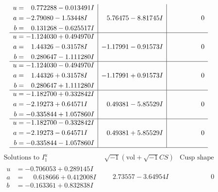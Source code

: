 \documentclass[1p]{elsarticle_modified}
\theoremstyle{definition}
\newcommand{\I}{\sqrt{-1}}
\begin{document}
$$\begin{array}{c|c|c}
\begin{aligned}
u &= \phantom{-}0.772288 - 0.013491 I \\
a &= -2.79080 - 1.53448 I \\
b &= \phantom{-}0.131268 - 0.625517 I\end{aligned}
 & \phantom{-}5.76475 - 8.81745 I & \phantom{-0.000000 } 0 \\ \hline\begin{aligned}
u &= -1.124030 + 0.494970 I \\
a &= \phantom{-}1.44326 - 0.31578 I \\
b &= \phantom{-}0.280647 - 1.111280 I\end{aligned}
 & -1.17991 - 0.91573 I & \phantom{-0.000000 } 0 \\ \hline\begin{aligned}
u &= -1.124030 - 0.494970 I \\
a &= \phantom{-}1.44326 + 0.31578 I \\
b &= \phantom{-}0.280647 + 1.111280 I\end{aligned}
 & -1.17991 + 0.91573 I & \phantom{-0.000000 } 0 \\ \hline\begin{aligned}
u &= -1.182700 + 0.332842 I \\
a &= -2.19273 + 0.64571 I \\
b &= -0.335844 + 1.057860 I\end{aligned}
 & \phantom{-}0.49381 - 5.85529 I & \phantom{-0.000000 } 0 \\ \hline\begin{aligned}
u &= -1.182700 - 0.332842 I \\
a &= -2.19273 - 0.64571 I \\
b &= -0.335844 - 1.057860 I\end{aligned}
 & \phantom{-}0.49381 + 5.85529 I & \phantom{-0.000000 } 0\\
 \hline 
 \end{array}$$\newpage$$\begin{array}{c|c|c}  
\text{Solutions to }I^u_{1}& \I (\text{vol} + \sqrt{-1}CS) & \text{Cusp shape}\\
 \hline 
\begin{aligned}
u &= -0.706053 + 0.289145 I \\
a &= \phantom{-}0.618666 + 0.412008 I \\
b &= -0.163361 + 0.832838 I\end{aligned}
 & \phantom{-}2.73557 - 3.64954 I & \phantom{-0.000000 } 0 \\ \hline\begin{aligned}

\end{aligned}
\end{array}$$
\end{document}
